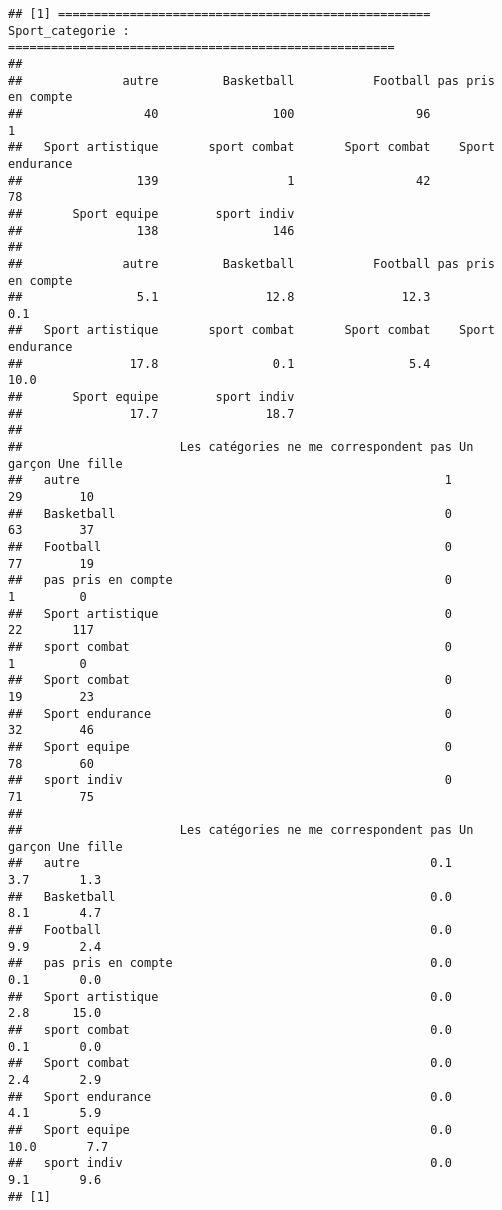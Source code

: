 \documentclass[
]{article}
\begin{document}
\begin{verbatim}
## [1] ==================================================== Sport_categorie : ======================================================
## 
##              autre         Basketball           Football pas pris en compte 
##                 40                100                 96                  1 
##   Sport artistique       sport combat       Sport combat    Sport endurance 
##                139                  1                 42                 78 
##       Sport equipe        sport indiv 
##                138                146 
## 
##              autre         Basketball           Football pas pris en compte 
##                5.1               12.8               12.3                0.1 
##   Sport artistique       sport combat       Sport combat    Sport endurance 
##               17.8                0.1                5.4               10.0 
##       Sport equipe        sport indiv 
##               17.7               18.7 
##                     
##                      Les catégories ne me correspondent pas Un garçon Une fille
##   autre                                                   1        29        10
##   Basketball                                              0        63        37
##   Football                                                0        77        19
##   pas pris en compte                                      0         1         0
##   Sport artistique                                        0        22       117
##   sport combat                                            0         1         0
##   Sport combat                                            0        19        23
##   Sport endurance                                         0        32        46
##   Sport equipe                                            0        78        60
##   sport indiv                                             0        71        75
##                     
##                      Les catégories ne me correspondent pas Un garçon Une fille
##   autre                                                 0.1       3.7       1.3
##   Basketball                                            0.0       8.1       4.7
##   Football                                              0.0       9.9       2.4
##   pas pris en compte                                    0.0       0.1       0.0
##   Sport artistique                                      0.0       2.8      15.0
##   sport combat                                          0.0       0.1       0.0
##   Sport combat                                          0.0       2.4       2.9
##   Sport endurance                                       0.0       4.1       5.9
##   Sport equipe                                          0.0      10.0       7.7
##   sport indiv                                           0.0       9.1       9.6
## [1]
\end{verbatim}
\end{document}
